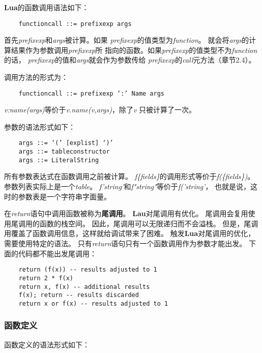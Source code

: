 \documentclass{ctexart}
\begin{document}
\textbf{Lua}的函数调用语法如下：

\lstset{language=C}
\begin{lstlisting}
	functioncall ::= prefixexp args
\end{lstlisting}

首先\emph{prefixexp}和\emph{args}被计算。如果
\emph{prefixexp}的值类型为\emph{function}。
就会将\emph{args}的计算结果作为参数调用\emph{prefixexp}所
指向的函数。如果\emph{prefixexp}的值类型不为\emph{function}的话，
\emph{prefixexp}的值和\emph{args}就会作为参数传给
\emph{prefixexp}的\emph{call}元方法（章节2.4）。

调用方法的形式为：

\lstset{language=C}
\begin{lstlisting}
	functioncall ::= prefixexp ‘:’ Name args
\end{lstlisting}

\emph{v:name(args)}等价于\emph{v.name(v,args)}，除了\emph{v}
只被计算了一次。

参数的语法形式如下：

\lstset{language=C}
\begin{lstlisting}
	args ::= ‘(’ [explist] ‘)’
	args ::= tableconstructor
	args ::= LiteralString
\end{lstlisting}

所有参数表达式在函数调用之前被计算。
\emph{f\{fields\}}的调用形式等价于\emph{f(\{fields\})}。
参数列表实际上是一个\emph{table}。
\emph{f'string'}和\emph{f"string"}等价于\emph{f('string'}，
也就是说，这时的参数表是一个字符串字面量。

在\emph{return}语句中调用函数被称为\textbf{尾调用}。
\textbf{Lau}对尾调用有优化。
尾调用会复用使用尾调用的函数的栈空间。
因此，尾调用可以无限递归而不会溢栈。
但是，尾调用覆盖了函数调用信息，这样就给调试带来了困难。
触发\textbf{Lua}对尾调用的优化，需要使用特定的语法。
只有\emph{return}语句只有一个函数调用作为参数才能出发。
下面的代码都不能出发尾调用：

\lstset{language=C}
\begin{lstlisting}
	return (f(x)) -- results adjusted to 1
	return 2 * f(x)
	return x, f(x) -- additional results
	f(x); return -- results discarded
	return x or f(x) -- results adjusted to 1
\end{lstlisting}

\subsubsection{函数定义}

函数定义的语法形式如下：
\end{document}
